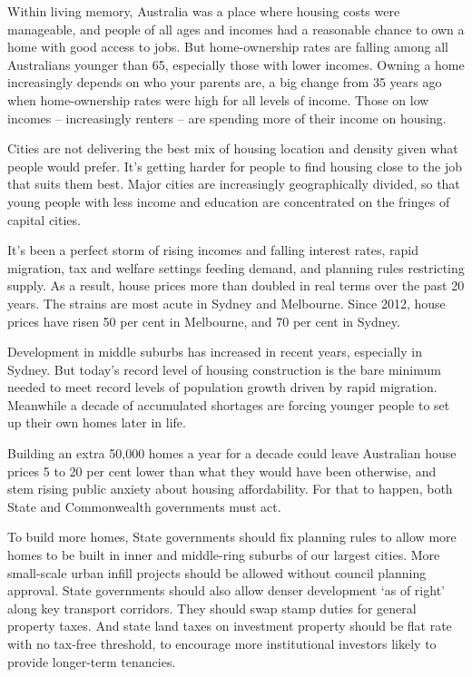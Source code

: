 \documentclass[FrontPage]{grattan}
\begin{document}
\begin{overview}
Within living memory, Australia was a place where housing costs were manageable, and people of all ages and incomes had a reasonable chance to own a home with good access to jobs.
But home-ownership rates are falling among all Australians younger than 65, especially those with lower incomes.
Owning a home increasingly depends on who your parents are, a big change from 35 years ago when home-ownership rates were high for all levels of income.
Those on low incomes – increasingly renters – are spending more of their income on housing.

Cities are not delivering the best mix of housing location and density given what people would prefer.
It's getting harder for people to find housing close to the job that suits them best. 
Major cities are increasingly geographically divided, so that young people with less income and education are concentrated on the fringes of capital cities.

It's been a perfect storm of rising incomes and falling interest rates, rapid migration, tax and welfare settings feeding demand, and planning rules restricting supply.
As a result, house prices more than doubled in real terms over the past 20 years. The strains are most acute in Sydney and Melbourne.
Since 2012, house prices have risen 50 per cent in Melbourne, and 70 per cent in Sydney.

Development in middle suburbs has increased in recent years, especially in Sydney.
But today’s record level of housing construction is the bare minimum needed to meet record levels of population growth driven by rapid migration.
Meanwhile a decade of accumulated shortages are forcing younger people to set up their own homes later in life.

Building an extra 50,000 homes a year for a decade could leave Australian house prices 
5 to 20 per cent lower than what they would have been otherwise, and stem rising public anxiety about housing affordability.
For that to happen, both State and Commonwealth governments must act.

To build more homes, State governments should fix planning rules to allow more homes to be built in inner and middle-ring suburbs of our largest cities.
More small-scale urban infill projects should be allowed without council planning approval. 
State governments should also allow denser development `as of right' along key transport corridors.
They should swap stamp duties for general property taxes.
And state land taxes on investment property should be flat rate with no tax-free threshold, to encourage more institutional investors likely to provide longer-term tenancies.


\end{overview}
\end{document}
